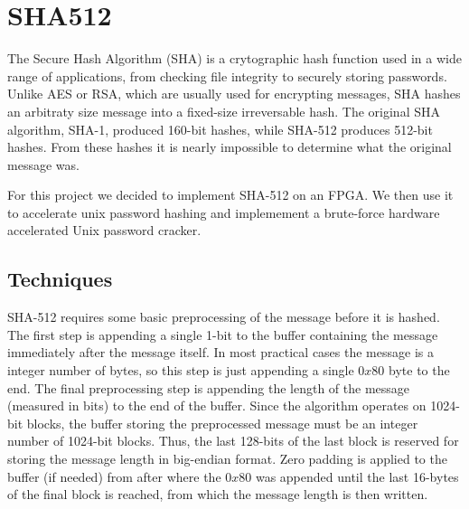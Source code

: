 \section{SHA512}
The Secure Hash Algorithm (SHA) is a crytographic hash function used in a wide range of applications, from checking
file integrity to securely storing passwords. Unlike AES or RSA, which are usually used for
encrypting messages, SHA hashes an arbitraty size message into a fixed-size irreversable hash.
The original SHA algorithm, SHA-1, produced 160-bit hashes, while SHA-512
produces 512-bit hashes. From these hashes it is nearly impossible to determine
what the original message was.

For this project we decided to implement SHA-512 on an FPGA.
We then use it to accelerate unix password hashing and implemement
a brute-force hardware accelerated Unix password cracker.

\subsection{Techniques}
SHA-512 requires some basic preprocessing of the message before it is hashed. The first
step is appending a single 1-bit to the buffer containing the message immediately after the message itself.
In most practical cases the message is a integer number of bytes, so this step is just appending
a single $0x80$ byte to the end. The final preprocessing step is appending the
length of the message (measured in bits) to the end of the buffer.
Since the algorithm operates on 1024-bit blocks, the buffer storing the preprocessed message
must be an integer number of 1024-bit blocks. Thus, the last 128-bits of the last block
is reserved for storing the message length in big-endian format. Zero padding is
applied to the buffer (if needed) from after where the $0x80$ was appended until the last 16-bytes
of the final block is reached, from which the message length is then written.


